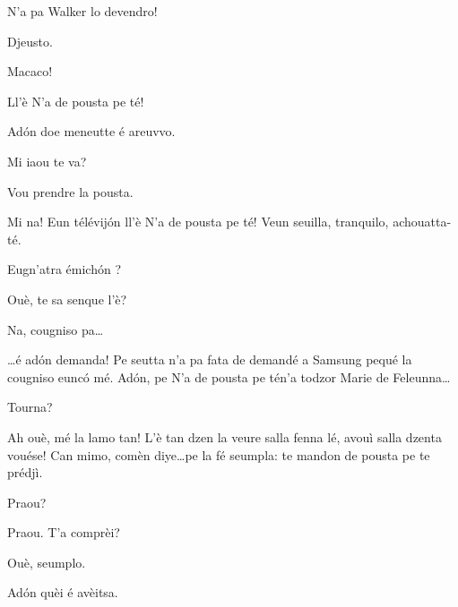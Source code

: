 \begin{drama}
\Vioujspeaks N'a pa Walker lo devendro!

\Vioupspeaks Djeusto.

\Vioujspeaks Macaco!

\Vioupspeaks Ll'è \og N'a de pousta pe té\fg!


\Vioujspeaks Ad\'on doe meneutte é areuvvo.

\Vioupspeaks Mi iaou te va?

\Vioujspeaks Vou prendre la pousta.

\Vioupspeaks Mi na! Eun télévij\'on ll'è \og N'a de pousta pe té\fg! Veun seuilla, tranquilo, achouatta-té.


\Vioujspeaks Eugn'atra émich\'on ?

\Vioupspeaks Ouè, te sa senque l'è?

\Vioujspeaks Na, cougniso pa\ldots

\Vioupspeaks \ldots é ad\'on demanda! Pe seutta n'a pa fata de demandé a Samsung pequé la cougniso eunc\'o mé. Ad\'on, pe \og N'a de pousta pe té\fg n'a todzor Marie de Feleunna\ldots

\Vioujspeaks Tourna?

\Vioupspeaks Ah ouè, mé la lamo tan! L'è tan dzen la veure salla fenna lé, avouì salla dzenta vouése! Can mimo, comèn diye\ldots pe la fé seumpla: te mandon de pousta pe te prédjì.

\Vioujspeaks Praou?

\Vioupspeaks Praou. T'a comprèi?

\Vioujspeaks Ouè, seumplo.

\Vioupspeaks Ad\'on quèi é avèitsa.



\scene[-- N'a de pousta pe té]


\label{pousta}
 


\end{drama}
